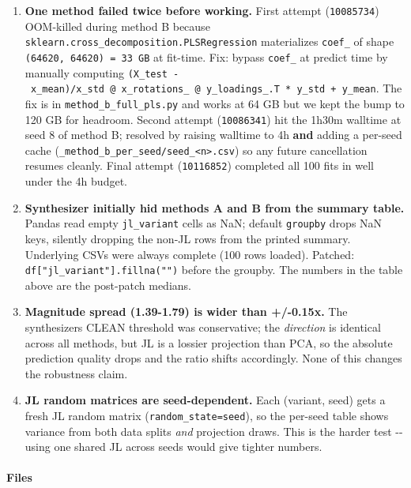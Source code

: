 \begin{enumerate}
\def\labelenumi{\arabic{enumi}.}
\tightlist
\item
  \textbf{One method failed twice before working.} First attempt (\texttt{10085734}) OOM-killed during method B because \texttt{sklearn.cross\_decomposition.PLSRegression} materializes \texttt{coef\_} of shape \texttt{(64620,\ 64620)\ =\ 33\ GB} at fit-time. Fix: bypass \texttt{coef\_} at predict time by manually computing \texttt{(X\_test\ -\ x\_mean)/x\_std\ @\ x\_rotations\_\ @\ y\_loadings\_.T\ *\ y\_std\ +\ y\_mean}. The fix is in \texttt{method\_b\_full\_pls.py} and works at 64 GB but we kept the bump to 120 GB for headroom. Second attempt (\texttt{10086341}) hit the 1h30m walltime at seed 8 of method B; resolved by raising walltime to 4h \textbf{and} adding a per-seed cache (\texttt{\_method\_b\_per\_seed/seed\_\textless{}n\textgreater{}.csv}) so any future cancellation resumes cleanly. Final attempt (\texttt{10116852}) completed all 100 fits in well under the 4h budget.
\item
  \textbf{Synthesizer initially hid methods A and B from the summary table.} Pandas read empty \texttt{jl\_variant} cells as NaN; default \texttt{groupby} drops NaN keys, silently dropping the non-JL rows from the printed summary. Underlying CSVs were always complete (100 rows loaded). Patched: \texttt{df{[}"jl\_variant"{]}.fillna("")} before the groupby. The numbers in the table above are the post-patch medians.
\item
  \textbf{Magnitude spread (1.39-1.79) is wider than +/-0.15x.} The synthesizer\textquotesingle s CLEAN threshold was conservative; the \emph{direction} is identical across all methods, but JL is a lossier projection than PCA, so the absolute prediction quality drops and the ratio shifts accordingly. None of this changes the robustness claim.
\item
  \textbf{JL random matrices are seed-dependent.} Each (variant, seed) gets a fresh JL random matrix (\texttt{random\_state=seed}), so the per-seed table shows variance from both data splits \emph{and} projection draws. This is the harder test -\/- using one shared JL across seeds would give tighter numbers.
\end{enumerate}

\paragraph{Files}\label{files}

